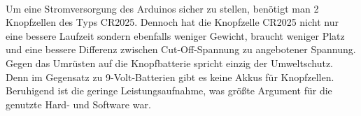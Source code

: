 \\
Um eine Stromversorgung des Arduinos sicher zu stellen, benötigt man 2 Knopfzellen
des Typs CR2025. Dennoch hat die Knopfzelle CR2025 nicht nur eine bessere 
Laufzeit sondern ebenfalls weniger Gewicht, braucht weniger Platz und eine bessere 
Differenz zwischen Cut-Off-Spannung zu angebotener Spannung.
\\
Gegen das Umrüsten auf die Knopfbatterie spricht einzig der Umweltschutz.
Denn im Gegensatz zu 9-Volt-Batterien gibt es keine Akkus für Knopfzellen.
Beruhigend ist die geringe Leistungsaufnahme, was größte Argument für die genutzte Hard- und Software 
war.